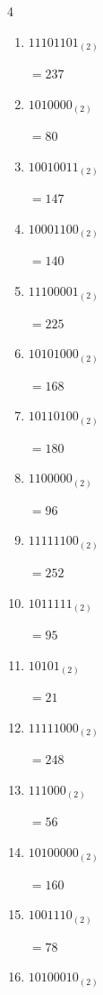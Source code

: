 \begin{multicols}{4}
\begin{enumerate}
        $=39$

  \item $11101101_{(2)}$

        $=237$

\columnbreak %

\resetques

  \item $1010000_{(2)}$

        $=80$

  \item $10010011_{(2)}$

        $=147$

  \item $10001100_{(2)}$

        $=140$

  \item $11100001_{(2)}$

        $=225$

  \item $10101000_{(2)}$

        $=168$

  \item $10110100_{(2)}$

        $=180$

  \item $1100000_{(2)}$

        $=96$

  \item $11111100_{(2)}$

        $=252$

  \item $1011111_{(2)}$

        $=95$

  \item $10101_{(2)}$

        $=21$

  \item $11111000_{(2)}$

        $=248$

  \item $111000_{(2)}$

        $=56$

  \item $10100000_{(2)}$

        $=160$

  \item $1001110_{(2)}$

        $=78$

  \item $10100010_{(2)}$


\end{enumerate}
\end{multicols}
